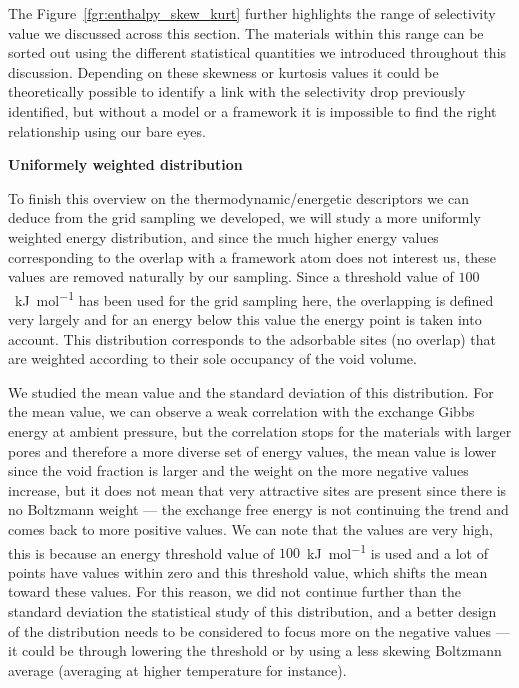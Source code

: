 \documentclass[main]{subfiles}
\begin{document}
The Figure~\ref{fgr:enthalpy_skew_kurt} further highlights the range of selectivity value we discussed across this section. The materials within this range can be sorted out using the different statistical quantities we introduced throughout this discussion. Depending on these skewness or kurtosis values it could be theoretically possible to identify a link with the selectivity drop previously identified, but without a model or a framework it is impossible to find the right relationship using our bare eyes.


\textbf{Uniformely weighted distribution}

To finish this overview on the thermodynamic/energetic descriptors we can deduce from the grid sampling we developed, we will study a more uniformly weighted energy distribution, and since the much higher energy values corresponding to the overlap with a framework atom does not interest us, these values are removed naturally by our sampling. Since a threshold value of $100$~\si{\kilo\joule\per\mole} has been used for the grid sampling here, the overlapping is defined very largely and for an energy below this value the energy point is taken into account. This distribution corresponds to the adsorbable sites (no overlap) that are weighted according to their sole occupancy of the void volume. 

We studied the mean value and the standard deviation of this distribution. For the mean value, we can observe a weak correlation with the exchange Gibbs energy at ambient pressure, but the correlation stops for the materials with larger pores and therefore a more diverse set of energy values, the mean value is lower since the void fraction is larger and the weight on the more negative values increase, but it does not mean that very attractive sites are present since there is no Boltzmann weight --- the exchange free energy is not continuing the trend and comes back to more positive values. We can note that the values are very high, this is because an energy threshold value of $100$~\si{\kilo\joule\per\mole} is used and a lot of points have values within zero and this threshold value, which shifts the mean toward these values. For this reason, we did not continue further than the standard deviation the statistical study of this distribution, and a better design of the distribution needs to be considered to focus more on the negative values --- it could be through lowering the threshold or by using a less skewing Boltzmann average (averaging at higher temperature for instance).
\end{document}
